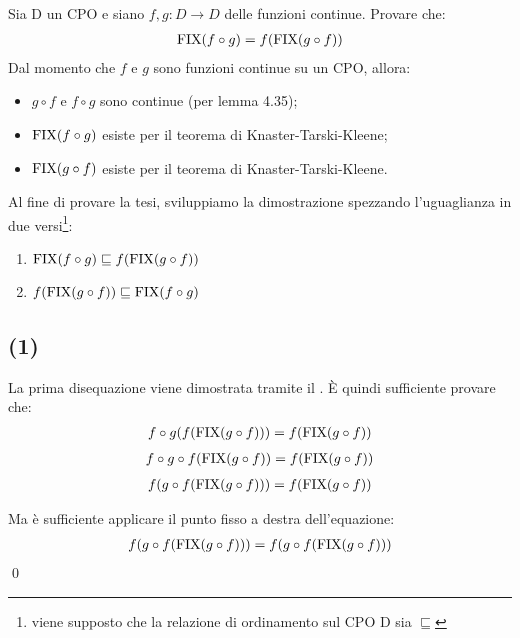 \newcommand{\lt}{\sqsubseteq}

{Sia D un CPO e siano $f,g: D \to{} D$ delle funzioni continue. Provare che:
\begin{align*}
\textrm{\normalfont{FIX}}(f \circ g) = f(\textrm{\normalfont{FIX}}(g \circ f))
\end{align*}
}
{}
Dal momento che $f$ e $g$ sono funzioni continue su un CPO, allora:

\begin{itemize}
  \item $g \circ f$ e $f \circ g$ sono continue (per lemma 4.35);
  \item $\textrm{\normalfont{FIX}}(f \circ g)$ esiste per il teorema di Knaster-Tarski-Kleene;
  \item $\textrm{\normalfont{FIX}}(g \circ f)$ esiste per il teorema di Knaster-Tarski-Kleene.
\end{itemize}

Al fine di provare la tesi, sviluppiamo la dimostrazione spezzando l'uguaglianza
in due versi\footnote{viene supposto che la relazione di ordinamento sul CPO D
sia $\lt$}:

\begin{enumerate}[label=(\arabic*)]
  \item $\fixp{f \circ g} \lt f(\fixp{g \circ f})$
  \item $f(\fixp{g \circ f}) \lt \fixp{f \circ g}$
\end{enumerate}

\subsection{(1)}
La prima disequazione viene dimostrata tramite il \FPIL. È quindi sufficiente
provare che:
\begin{align*}
f \circ g(f(\textrm{\normalfont{FIX}}(g \circ f))) = f(\textrm{\normalfont{FIX}}(g \circ f))
\end{align*}
\begin{align*}
f \circ g \circ f(\textrm{\normalfont{FIX}}(g \circ f)) = f(\textrm{\normalfont{FIX}}(g \circ f))
\end{align*}
\begin{align*}
f (g \circ f(\textrm{\normalfont{FIX}}(g \circ f))) = f(\textrm{\normalfont{FIX}}(g \circ f))
\end{align*}

Ma è sufficiente applicare il punto fisso a destra dell'equazione:
\begin{align*}
f (g \circ f(\textrm{\normalfont{FIX}}(g \circ f))) = f (g \circ f(\textrm{\normalfont{FIX}}(g \circ f)))
\end{align*} \qed

